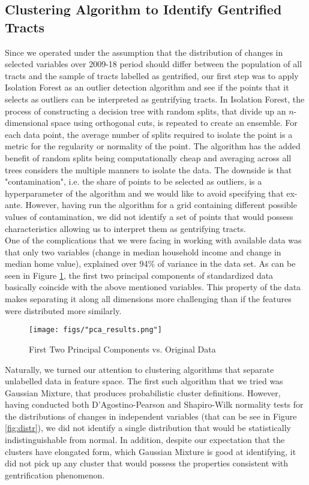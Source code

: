 \documentclass[a4paper, 12pt]{article}
\numberwithin{equation}{section}
\begin{document}
		\subsection{Clustering Algorithm to Identify Gentrified Tracts}
	        Since we operated under the assumption that the distribution of changes in selected variables over 2009-18 period should differ between the population of all tracts and the sample of tracts labelled as gentrified, our first step was to apply Isolation Forest as an outlier detection algorithm and see if the points that it selects as outliers can be interpreted as gentrifying tracts. In Isolation Forest, the process of constructing a decision tree with random splits, that divide up an $n$-dimensional space using orthogonal cuts, is repeated to create an ensemble. For each data point, the average number of splits required to isolate the point is a metric for the regularity or normality of the point. The algorithm has the added benefit of random splits being computationally cheap and averaging across all trees considers the multiple manners to isolate the data. The downside is that "contamination", i.e. the share of points to be selected as outliers, is a hyperparameter of the algorithm and we would like to avoid specifying that ex-ante. However, having run the algorithm for a grid containing different possible values of contamination, we did not identify a set of points that would possess characteristics allowing us to interpret them as gentrifying tracts.\\
	        
	        One of the complications that we were facing in working with available data was that only two variables (change in median household income and change in median home value), explained over 94\% of variance in the data set. As can be seen in Figure \ref{fig:pca}, the first two principal components of standardized data basically coincide with the above mentioned variables. This property of the data makes separating it along all dimensions more challenging than if the features were distributed more similarly.
	        
	            \begin{figure}[H]
				    \centering
				    \texttt{[image: figs/"pca\_results.png"]}
				    \caption{First Two Principal Components vs. Original Data}
				    \label{fig:pca}
			    \end{figure}
	            
	        Naturally, we turned our attention to clustering algorithms that separate unlabelled data in feature space. The first such algorithm that we tried was Gaussian Mixture, that produces probabilistic cluster definitions. However, having conducted both D'Agostino-Pearson and Shapiro-Wilk normality tests for the distributions of changes in independent variables (that can be see in Figure \ref{fig:distr}), we did not identify a single distribution that would be statistically indistinguishable from normal. In addition, despite our expectation that the clusters have elongated form, which Gaussian Mixture is good at identifying, it did not pick up any cluster that would possess the properties consistent with gentrification phenomenon. \\
	 
\end{document}
